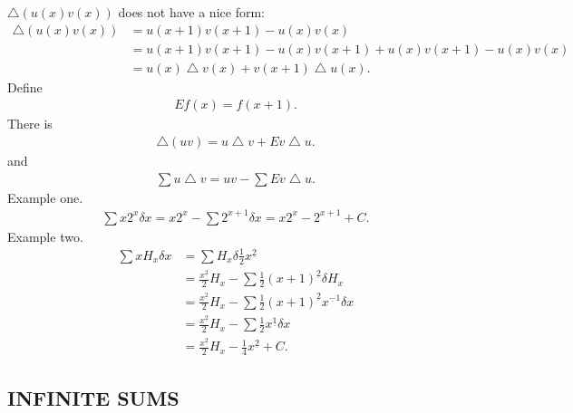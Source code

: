 \documentclass{article}
\begin{document}
$\bigtriangleup (u(x)v(x))$ does not have a nice form:
\begin{align}
\bigtriangleup(u(x)v(x)) &= u(x+1)v(x+1) - u(x)v(x) \\
			 &= u(x+1)v(x+1) - u(x)v(x+1) + u(x)v(x+1) - u(x)v(x)\\
			 &= u(x)\bigtriangleup v(x) + v(x+1)\bigtriangleup u(x).
\end{align}
Define 
\begin{align}
Ef(x) = f(x+1).
\end{align}
There is
\begin{align}
\bigtriangleup (uv) = u\bigtriangleup v + Ev\bigtriangleup u.
\end{align}
and 
\begin{align}
\sum u \bigtriangleup v = uv - \sum Ev \bigtriangleup u.
\end{align}
Example one.
\begin{align}
\sum x2^x \delta x = x2^x - \sum 2^{x+1} \delta x = x2^x - 2^{x+1} + C.
\end{align}
Example two.
\begin{align}
\sum xH_x \delta x &= \sum H_x \delta \frac{1}{2}x^{\underline 2} \\
		   &= \frac{x^{\underline 2}}{2}H_x - \sum \frac{1}{2}(x+1)^{\underline 2}\delta H_x \\
		   &= \frac{x^{\underline 2}}{2}H_x - \sum \frac{1}{2}(x+1)^{\underline 2}x^{\underline -1}\delta x \\
		   &= \frac{x^{\underline 2}}{2}H_x - \sum \frac{1}{2}x^{\underline 1} \delta x \\
		   &= \frac{x^{\underline 2}}{2}H_x - \frac{1}{4}x^{\underline 2} + C.
\end{align}

\subsection{INFINITE SUMS}
\end{document}
